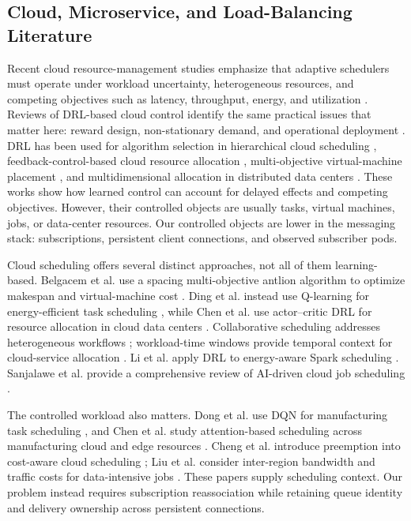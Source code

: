 \documentclass[manuscript,nonacm]{acmart}
\begin{document}
\subsection{Cloud, Microservice, and Load-Balancing Literature}

Recent cloud resource-management studies emphasize that adaptive schedulers
must operate under workload uncertainty, heterogeneous resources, and competing
objectives such as latency, throughput, energy, and utilization
\cite{Khan2022MLCloudReview}. Reviews of DRL-based cloud control identify the
same practical issues that matter here: reward design, non-stationary demand,
and operational deployment \cite{Zhou2024DRLCloudReview}. DRL has been used
for algorithm selection in hierarchical cloud scheduling
\cite{Zhou2022DRLSelector}, feedback-control-based cloud resource allocation
\cite{Chen2022RLFeedback}, multi-objective virtual-machine placement
\cite{Caviglione2021VMPlacement}, and multidimensional allocation in
distributed data centers \cite{Wei2023TNSM}. These works show how learned
control can account for delayed effects and competing objectives.
However, their controlled objects are usually tasks, virtual machines, jobs, or
data-center resources. Our controlled objects are lower in the messaging
stack: subscriptions, persistent client connections, and observed subscriber
pods.

Cloud scheduling offers several distinct approaches, not all of them
learning-based. Belgacem et al. use a spacing multi-objective antlion algorithm
to optimize makespan and virtual-machine cost \cite{Belgacem2020DynamicResource}.
Ding et al. instead use Q-learning for energy-efficient task scheduling
\cite{Ding2020QLearningCloud}, while Chen et al. use actor--critic DRL for
resource allocation in cloud data centers \cite{Chen2022ActorCritic}.
Collaborative scheduling addresses heterogeneous workflows
\cite{Chen2023CollaborativeScheduling}; workload-time windows provide temporal
context for cloud-service allocation \cite{Chen2023WorkloadWindows}.
Li et al. apply DRL to energy-aware Spark scheduling \cite{Li2023SparkDRL}.
Sanjalawe et al. provide a comprehensive review of AI-driven cloud job
scheduling \cite{Sanjalawe2025AIJobScheduling}.

The controlled workload also matters. Dong et al. use DQN for manufacturing
task scheduling \cite{Dong2020CloudManufacturing}, and Chen et al. study
attention-based scheduling across manufacturing cloud and edge resources
\cite{Chen2023CloudEdgeManufacturing}. Cheng et al. introduce preemption into
cost-aware cloud scheduling \cite{Cheng2023PreemptiveCloud}; Liu et al. consider
inter-region bandwidth and traffic costs for data-intensive jobs
\cite{Liu2026GeoDRL}. These papers supply scheduling context. Our problem
instead requires subscription reassociation while retaining queue identity
and delivery ownership across persistent connections.
\end{document}
